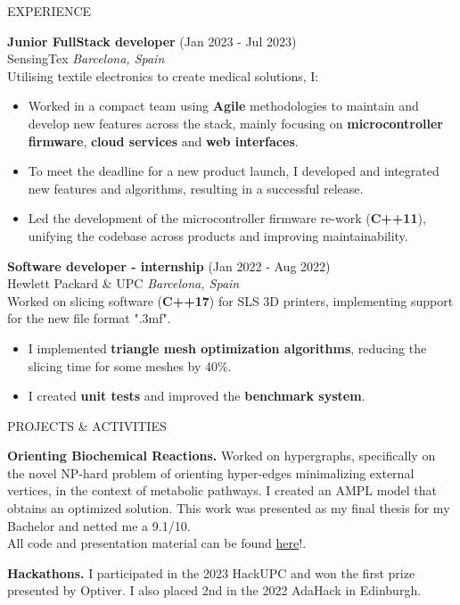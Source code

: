 \documentclass{resume} %
\begin{document}
\begin{rSection}{EXPERIENCE}

\textbf{Junior FullStack developer} \hfill (Jan 2023 - Jul 2023)\\
SensingTex \hfill \textit{Barcelona, Spain}\\
Utilising textile electronics to create medical solutions, I:
\begin{itemize}
    \itemsep -3pt {} 
     \item Worked in a compact team using {\bf Agile} methodologies to maintain and develop new features across the stack, mainly focusing on {\bf microcontroller firmware}, {\bf cloud services} and {\bf web interfaces}.
     \item To meet the deadline for a new product launch, I developed and integrated new features and algorithms, resulting in a successful release.
     \item Led the development of the microcontroller firmware re-work ({\bf C++11}), unifying the codebase across products and improving maintainability.
\end{itemize}
 
\textbf{Software developer - internship} \hfill (Jan 2022 - Aug 2022)\\
Hewlett Packard \& UPC \hfill \textit{Barcelona, Spain}\\
Worked on slicing software ({\bf C++17}) for SLS 3D printers, implementing support for the new file format ".3mf".
 \begin{itemize}
     \itemsep -3pt {} 
      \item I implemented {\bf triangle mesh optimization algorithms}, reducing the slicing time for some meshes by 40\%.
      \item I created {\bf unit tests} and improved the {\bf benchmark system}.
     \end{itemize}

\end{rSection} 


\begin{rSection}{PROJECTS \& ACTIVITIES}
    \vspace{-1.25em}
    \item \textbf{Orienting Biochemical Reactions.} {
            Worked on hypergraphs, specifically on the novel NP-hard problem of orienting hyper-edges minimalizing external vertices, in the context of metabolic pathways. 
            I created an AMPL model that obtains an optimized solution. 
            This work was presented as my final thesis for my Bachelor and netted me a 9.1/10. \\
            All code and presentation material can be found \href{https://github.com/ZephyrSV/tfg_python}{here}!.
        }
    \item \textbf{Hackathons.} {
        I participated in the 2023 HackUPC and won the first prize presented by Optiver.
        I also placed 2nd in the 2022 AdaHack in Edinburgh.
    }
\end{rSection} 
\end{document}
